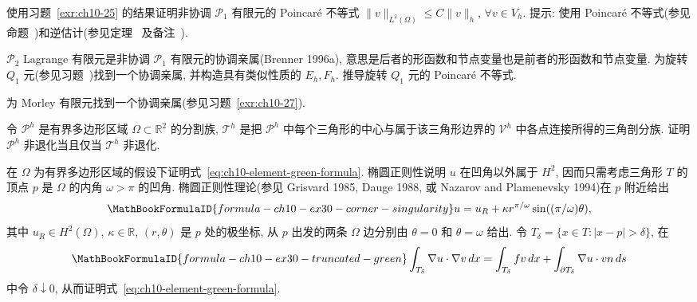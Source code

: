 \begin{MBExercise}
\label{exr:ch10-26}
使用习题~\ref{exr:ch10-25} 的结果证明非协调 $\mathcal P_1$ 有限元的 Poincaré 不等式 $\|v\|_{L^2(\Omega)}\leq C\|v\|_h$, $\forall v\in V_h$. 提示: 使用 Poincaré 不等式(参见命题~)和逆估计(参见定理~ 及备注~).
\end{MBExercise}

\begin{MBExercise}
\label{exr:ch10-27}
$\mathcal P_2$ Lagrange 有限元是非协调 $\mathcal P_1$ 有限元的协调亲属(Brenner 1996a), 意思是后者的形函数和节点变量也是前者的形函数和节点变量. 为旋转 $Q_1$ 元(参见习题~)找到一个协调亲属, 并构造具有类似性质的 $E_h,F_h$. 推导旋转 $Q_1$ 元的 Poincaré 不等式.
\end{MBExercise}

\begin{MBExercise}
\label{exr:ch10-28}
为 Morley 有限元找到一个协调亲属(参见习题~\ref{exr:ch10-27}).
\end{MBExercise}

\begin{MBExercise}
\label{exr:ch10-29}
令 $\mathcal P^h$ 是有界多边形区域 $\Omega\subset\mathbb R^2$ 的分割族, $\mathcal T^h$ 是把 $\mathcal P^h$ 中每个三角形的中心与属于该三角形边界的 $\mathcal V^h$ 中各点连接所得的三角剖分族. 证明 $\mathcal P^h$ 非退化当且仅当 $\mathcal T^h$ 非退化.
\end{MBExercise}

\begin{MBExercise}
\label{exr:ch10-30}
在 $\Omega$ 为有界多边形区域的假设下证明式~\eqref{eq:ch10-element-green-formula}. 椭圆正则性说明 $u$ 在凹角以外属于 $H^2$, 因而只需考虑三角形 $T$ 的顶点 $p$ 是 $\Omega$ 的内角 $\omega>\pi$ 的凹角. 椭圆正则性理论(参见 Grisvard 1985, Dauge 1988, 或 Nazarov and Plamenevsky 1994)在 $p$ 附近给出
\[
\MathBookFormulaID{formula-ch10-ex30-corner-singularity}
u=u_R+\kappa r^{\pi/\omega}\sin((\pi/\omega)\theta),
\]
其中 $u_R\in H^2(\Omega)$, $\kappa\in\mathbb R$, $(r,\theta)$ 是 $p$ 处的极坐标, 从 $p$ 出发的两条 $\Omega$ 边分别由 $\theta=0$ 和 $\theta=\omega$ 给出. 令 $T_\delta=\{x\in T:|x-p|>\delta\}$, 在
\[
\MathBookFormulaID{formula-ch10-ex30-truncated-green}
\int_{T_\delta}\nabla u\cdot\nabla v\,dx
=\int_{T_\delta}fv\,dx+\int_{\partial T_\delta}\nabla u\cdot vn\,ds
\]
中令 $\delta\downarrow0$, 从而证明式~\eqref{eq:ch10-element-green-formula}.
\end{MBExercise}

